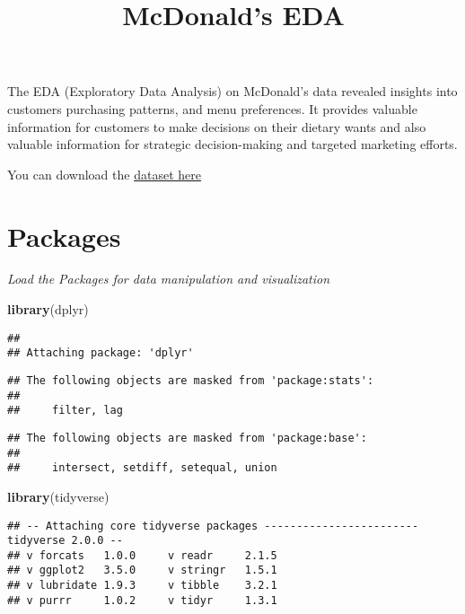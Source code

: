 \documentclass[
]{article}
\title{McDonald's EDA}
\author{}
\date{\vspace{-2.5em}}
\newenvironment{Shaded}{\begin{snugshade}}{\end{snugshade}}
\newcommand{\FunctionTok}[1]{\textcolor[rgb]{0.13,0.29,0.53}{\textbf{#1}}}
\newcommand{\NormalTok}[1]{#1}
\begin{document}
\maketitle

The EDA (Exploratory Data Analysis) on McDonald's data revealed insights
into customers purchasing patterns, and menu preferences. It provides
valuable information for customers to make decisions on their dietary
wants and also valuable information for strategic decision-making and
targeted marketing efforts.

You can download the
\href{https://www.kaggle.com/datasets/mcdonalds/nutrition-facts/data}{dataset
here}

\hypertarget{packages}{%
\section{Packages}\label{packages}}

\emph{Load the Packages for data manipulation and visualization}

\begin{Shaded}
\begin{Highlighting}[]
\FunctionTok{library}\NormalTok{(dplyr)}
\end{Highlighting}
\end{Shaded}

\begin{verbatim}
## 
## Attaching package: 'dplyr'
\end{verbatim}

\begin{verbatim}
## The following objects are masked from 'package:stats':
## 
##     filter, lag
\end{verbatim}

\begin{verbatim}
## The following objects are masked from 'package:base':
## 
##     intersect, setdiff, setequal, union
\end{verbatim}

\begin{Shaded}
\begin{Highlighting}[]
\FunctionTok{library}\NormalTok{(tidyverse)}
\end{Highlighting}
\end{Shaded}

\begin{verbatim}
## -- Attaching core tidyverse packages ------------------------ tidyverse 2.0.0 --
## v forcats   1.0.0     v readr     2.1.5
## v ggplot2   3.5.0     v stringr   1.5.1
## v lubridate 1.9.3     v tibble    3.2.1
## v purrr     1.0.2     v tidyr     1.3.1
\end{verbatim}
\end{document}
